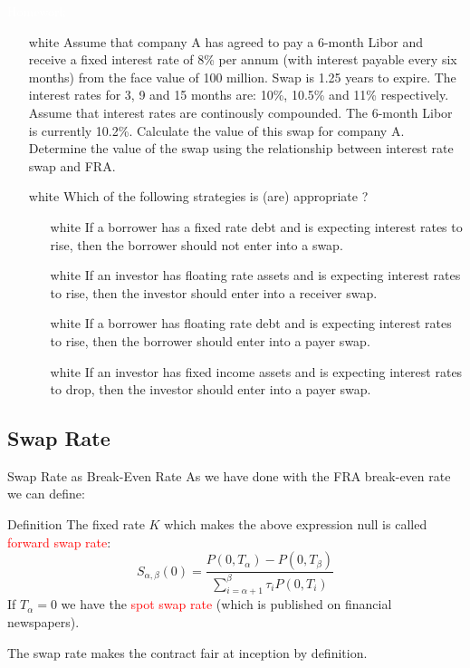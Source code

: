 \documentclass{beamer}
\begin{document}
\begin{homework}
\begin{frame}{\textcolor{white}{Homework}}
\begin{itemize}
\item[white] Assume that company A has agreed to pay a 6-month Libor and receive a fixed interest rate of 8\% per annum (with interest payable every six months) from the face value of 100 million. Swap is 1.25 years to expire. The interest rates for 3, 9 and 15 months are: 10\%, 10.5\% and 11\% respectively. Assume that interest rates are continously compounded. The 6-month Libor is currently 10.2\%. Calculate the value of this swap for company A. Determine the value of the swap using the relationship between interest rate swap and FRA.
\item[white] Which of the following strategies is (are) appropriate ?
\small{
\begin{itemize}
	\item[white] If a borrower has a fixed rate debt and is expecting interest rates to rise, then the borrower should not enter into a swap.
	\item[white] If an investor has floating rate assets and is expecting interest rates to rise, then the investor should enter into a receiver swap.
	\item[white] If a borrower has floating rate debt and is expecting interest rates to rise, then the borrower should enter into a payer swap.
	\item[white] If an investor has fixed income assets and is expecting interest rates to drop, then the investor should enter into a payer swap.
\end{itemize}}
\end{itemize}
\end{frame}
\end{homework}

\subsection{Swap Rate}
\begin{frame}{Swap Rate as Break-Even Rate}
	As we have done with the FRA break-even rate we can define:
	\begin{block}{Definition}
	The fixed rate $K$ which makes the above expression null is called \textcolor{red}{forward swap rate}:
	\begin{equation}
		S_{\alpha,\beta}(0) = \frac{P(0, T_\alpha)-P(0,T_\beta)}{\sum_{i=\alpha+1}^{\beta}\tau_iP(0,T_i)}
	\end{equation}
	If $T_\alpha=0$ we have the \textcolor{red}{spot swap rate} (which is published on financial newspapers).
	\end{block}
	The swap rate makes the contract fair at inception by definition.
\end{frame}
\end{document}
